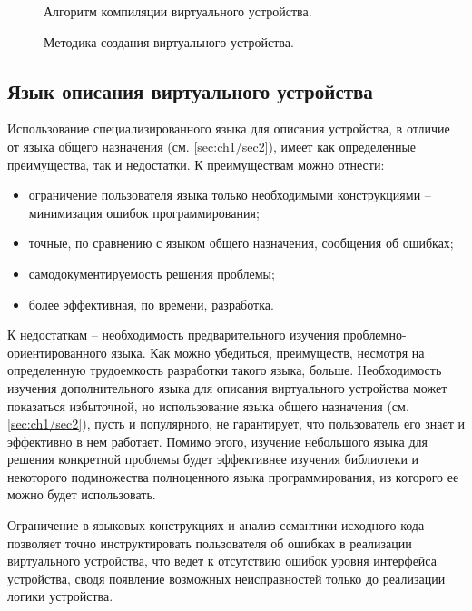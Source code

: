 \begin{figure}[!htbp]
    \centering
    
    \caption{Алгоритм компиляции виртуального устройства.}\label{fig:device-compilation}
\end{figure}


\begin{figure}[!htbp]
    \centering
    
    \caption{Методика создания виртуального устройства.}\label{fig:device-methodics}
\end{figure}


\subsection{Язык описания виртуального устройства}\label{sec:ch2/sec1/sub1}

Использование специализированного языка для описания устройства, в отличие от языка общего назначения (см. \cref{sec:ch1/sec2}),
имеет как определенные преимущества, так и недостатки.
К преимуществам можно отнести:
\begin{itemize}
    \item ограничение пользователя языка только необходимыми конструкциями -- минимизация ошибок программирования;
    \item точные, по сравнению с языком общего назначения, сообщения об ошибках;
    \item самодокументируемость решения проблемы;
    \item более эффективная, по времени, разработка.
\end{itemize}

К недостаткам -- необходимость предварительного изучения проблемно-ориентированного языка.
Как можно убедиться, преимуществ, несмотря на определенную трудоемкость разработки такого языка,
больше.
Необходимость изучения дополнительного языка для описания виртуального устройства может показаться
избыточной, но использование языка общего назначения (см.\cref{sec:ch1/sec2}),
пусть и популярного, не гарантирует, что пользователь его знает и эффективно в нем работает.
Помимо этого, изучение небольшого языка для решения конкретной проблемы будет эффективнее
изучения библиотеки и некоторого подмножества полноценного языка программирования,
из которого ее можно будет использовать.

Ограничение в языковых конструкциях и анализ семантики исходного кода
позволяет точно инструктировать пользователя об ошибках в реализации виртуального устройства,
что ведет к отсутствию ошибок уровня интерфейса устройства,
сводя появление возможных неисправностей только до реализации логики устройства.

